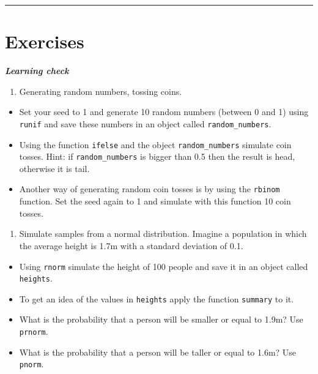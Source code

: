 \documentclass[
]{book}
\providecommand{\tightlist}{%
  \setlength{\itemsep}{0pt}\setlength{\parskip}{0pt}}
\begin{document}
\begin{center}\rule{0.5\linewidth}{0.5pt}\end{center}

\hypertarget{exercises}{%
\section{Exercises}\label{exercises}}

\textbf{\emph{Learning check}}

\begin{enumerate}
\def\labelenumi{\arabic{enumi}.}
\tightlist
\item
  Generating random numbers, tossing coins.
\end{enumerate}

\begin{itemize}
\tightlist
\item
  Set your seed to 1 and generate 10 random numbers (between 0 and 1) using \texttt{runif} and save these numbers in an object called \texttt{random\_numbers}.
\item
  Using the function \texttt{ifelse} and the object \texttt{random\_numbers} simulate coin tosses. Hint: if \texttt{random\_numbers} is bigger than 0.5 then the result is head, otherwise it is tail.
\item
  Another way of generating random coin tosses is by using the \texttt{rbinom} function. Set the seed again to 1 and simulate with this function 10 coin tosses.
\end{itemize}

\begin{enumerate}
\def\labelenumi{\arabic{enumi}.}
\setcounter{enumi}{1}
\tightlist
\item
  Simulate samples from a normal distribution. Imagine a population in which the average height is 1.7m with a standard deviation of 0.1.
\end{enumerate}

\begin{itemize}
\tightlist
\item
  Using \texttt{rnorm} simulate the height of 100 people and save it in an object called \texttt{heights}.
\item
  To get an idea of the values in \texttt{heights} apply the function \texttt{summary} to it.
\item
  What is the probability that a person will be smaller or equal to 1.9m? Use \texttt{prnorm}.
\item
  What is the probability that a person will be taller or equal to 1.6m? Use \texttt{pnorm}.
\end{itemize}
\end{document}
